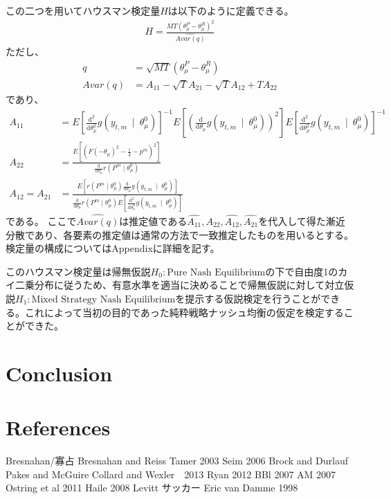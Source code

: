 \documentclass{jsarticle}
\begin{document}
この二つを用いてハウスマン検定量$H$は以下のように定義できる。
\begin{align*}
	H = \frac{MT(\theta_{\mu}^P - \theta_{\mu}^R)^2}{\hat{Avar(q)}}
\end{align*}
ただし、
\begin{align*}
	q &= \sqrt{MT}(\theta_{\mu}^P - \theta_{\mu}^R)\\[8pt]
	Avar(q) &= A_{11} - \sqrt{T}A_{21} - \sqrt{T}A_{12} + TA_{22}
\end{align*}
であり、
\begin{align*}
	A_{11} &= E\left[ \frac{\mathrm{d}^2}{\mathrm{d}\theta_{\mu}^2} g(y_{t,m}\ \mid\ \theta_{\mu}^0) \right] ^{-1} E\left[ \left( \frac{\mathrm{d}}{\mathrm{d}\theta_{\mu}} g(y_{t,m}\ \mid\ \theta_{\mu}^0) \right)^2 \right] E\left[ \frac{\mathrm{d}^2}{\mathrm{d}\theta_{\mu}^2} g(y_{t,m}\ \mid\ \theta_{\mu}^0) \right] ^{-1}\\[10pt]
	A_{22} &= \frac{E\left[\left( F(-\theta_{\mu})^2 -\frac{1}{4} - p^m \right)^2\right]}{\frac{\mathrm{d}}{\mathrm{d}\theta_{\mu}}r(P^m\mid \theta_{\mu}^0)}\\[10pt]
	A_{12} = A_{21} &= \frac{E\left[ r(P^m\mid \theta_{\mu}^0) \frac{\mathrm{d}}{\mathrm{d}\theta_{\mu}} g(y_{t,m}\ \mid\ \theta_{\mu}^0) \right]}{\frac{\mathrm{d}}{\mathrm{d}\theta_{\mu}}r(P^m\mid \theta_{\mu}^0) E\left[ \frac{\mathrm{d}^2}{\mathrm{d}\theta_{\mu}^2} g(y_{t,m}\ \mid\ \theta_{\mu}^0) \right]}
\end{align*}
である。
ここで$\hat{Avar(q)}$は推定値である$\hat{A_{11}},\hat{A_{22}},\hat{A_{12}},\hat{A_{21}}$を代入して得た漸近分散であり、各要素の推定値は通常の方法で一致推定したものを用いるとする。検定量の構成についてはAppendixに詳細を記す。

このハウスマン検定量は帰無仮説$H_0 : \text{Pure Nash Equilibrium}$の下で自由度1のカイ二乗分布に従うため、有意水準を適当に決めることで帰無仮説に対して対立仮説$H_1 : \text{Mixed Strategy Nash Equilibrium}$を提示する仮説検定を行うことができる。これによって当初の目的であった純粋戦略ナッシュ均衡の仮定を検定することができた。

\section{Conclusion}

\section{References}
\begin{thebibliography}{10}
	 Bresnahan/寡占
	 Bresnahan and Reiss
	 Tamer 2003
	 Seim 2006
	 Brock and Durlauf
	 Pakes and McGuire
	 Collard and Wexler　2013
	 Ryan 2012
	 BBl 2007
	 AM 2007
	 Ostring et al 2011
	 Haile 2008
	 Levitt サッカー
	 Eric van Damme 1998
\end{thebibliography}
\end{document}
